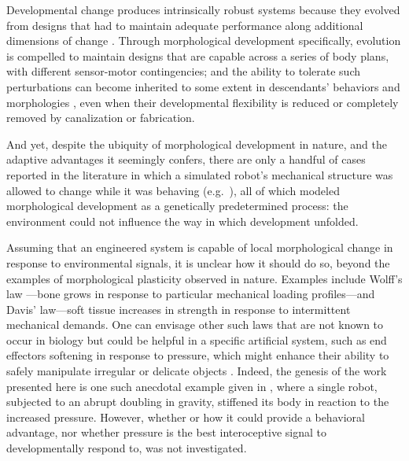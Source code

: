 Developmental change produces intrinsically robust systems because they evolved from designs that had to maintain adequate performance along additional dimensions of change \citep{bongard2011morphological,kriegman2018morphological}.
Through morphological development specifically, evolution is compelled to maintain designs that are capable across a series of body plans, with different 
sensor-motor contingencies; and the ability to tolerate such perturbations can become inherited to some extent in descendants' behaviors \cite{bongard2011morphological} and morphologies \cite{kriegman2018morphological}, even when their developmental flexibility is reduced or completely removed by canalization or fabrication.


And yet, despite the ubiquity of
morphological development in nature, and the adaptive advantages it seemingly confers, there are only a handful of cases reported in the literature in which a simulated robot's mechanical structure was allowed to change while it was behaving 
(e.g.~\citep{ventrella1998designing,
komosinski2003framsticks,
bongard2011morphological,
kriegman2018morphological,
kriegman2017minimal}),
all of which modeled morphological development as a genetically predetermined process: the environment could not influence the way in which development unfolded. 


Assuming that an engineered system is capable of local morphological change in response to environmental signals, it is unclear how it should do so, beyond the examples of morphological plasticity observed in nature. 
Examples include Wolff's law \citep{ruff2006s}---bone grows in response to particular mechanical loading profiles---and Davis' law---soft tissue increases in strength in response to intermittent mechanical demands.
One can envisage other such laws that are not known to occur in biology but could be helpful in a specific artificial system, such as end effectors softening in response to pressure, which might enhance their ability to safely manipulate irregular or delicate objects \cite{brown2010universal}.
Indeed, the genesis of the work presented here is one such anecdotal example given in \citep{corucci2017evolutionary}, where a single robot, subjected to an abrupt doubling in gravity, stiffened its body in reaction to the increased pressure.
However, whether or how it could provide a behavioral advantage, nor whether pressure is the best interoceptive signal to developmentally respond to,
was not investigated.

